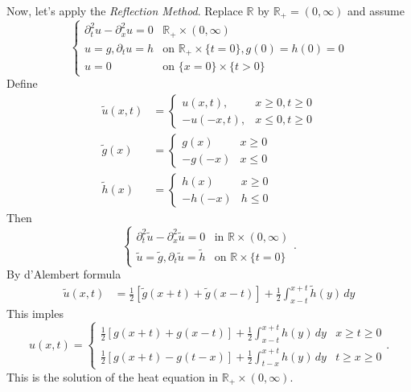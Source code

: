 \documentclass{report}
\theoremstyle{tommy}
\begin{document}
	Now, let's apply the \emph{Reflection Method}. Replace \(\mathbb{R}\) by \(\mathbb{R}_+ = (0,\infty)\) and assume
	\[\begin{cases}
		\partial_t^2 u - \partial_x^2 u = 0 &\mathbb{R}_+ \times (0,\infty) \\
		u = g, \partial_t u = h &\text{on } \mathbb{R}_+ \times \{t = 0\}, g(0) = h(0) = 0 \\
		u = 0 &\text{on } \{x = 0\} \times \{t > 0\}
	\end{cases}\]
	Define
	\begin{align*}
		\tilde u(x,t) &= \begin{cases}
			u(x,t),&x \ge 0, t \ge 0 \\
			-u(-x,t),&x \le 0, t \ge 0
		\end{cases}\\
		\tilde g(x) &= \begin{cases}
			g(x) &x \ge 0 \\
			-g(-x) &x \le 0
		\end{cases} \\
		\tilde h(x) &= \begin{cases}
			h(x) &x \ge 0 \\
			-h(-x) &h \le 0
		\end{cases}
	\end{align*}
	Then 
	\[\begin{cases}
		\partial_t^2 \tilde u - \partial_x^2 \tilde u = 0 &\text{in } \mathbb{R} \times (0,\infty) \\
		\tilde u = \tilde g, \partial_t \tilde u = \tilde h & \text{on } \mathbb{R} \times \{t = 0\}
	\end{cases}.\]
	By d'Alembert formula 
	\begin{align*}
		\tilde u(x,t) &= \frac{1}{2} \left[\tilde g(x+t) + \tilde g(x-t)\right] + \frac{1}{2} \int_{x - t}^{x+t} \tilde h(y) \, dy
	\end{align*}
  This imples 
  \[u(x,t) = \begin{cases}
    \frac{1}{2} [g(x+t)+g(x-t)] + \frac{1}{2} \int_{x-t}^{x+t}h(y) \, dy &x \ge t \ge 0 \\
    \frac{1}{2} [g(x+t)-g(t-x)] + \frac{1}{2} \int_{t-x}^{x+t} h(y) \, dy &t \ge x \ge 0
  \end{cases}.\]
  This is the solution of the heat equation in \(\mathbb{R}_+ \times (0,\infty)\).
\end{document}
